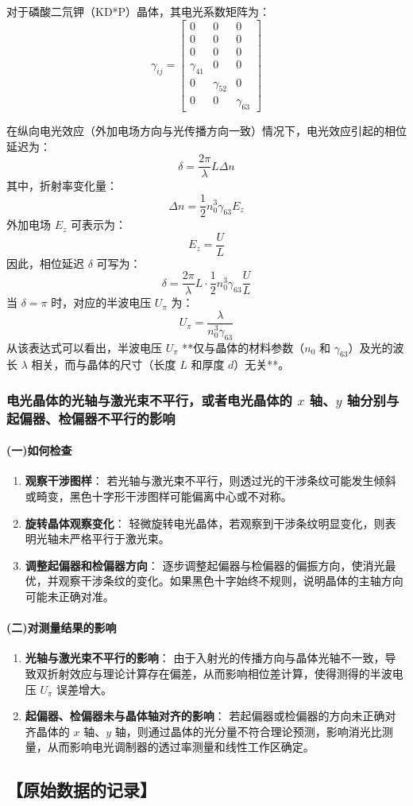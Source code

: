 \documentclass[12pt,a4paper,UTF8]{ctexart}
\begin{document}
对于磷酸二氘钾（KD*P）晶体，其电光系数矩阵为：
\[
\gamma_{ij} =
\begin{bmatrix}
0 & 0 & 0 \\
0 & 0 & 0 \\
0 & 0 & 0 \\
\gamma_{41} & 0 & 0 \\
0 & \gamma_{52} & 0 \\
0 & 0 & \gamma_{63}
\end{bmatrix}
\]

在纵向电光效应（外加电场方向与光传播方向一致）情况下，电光效应引起的相位延迟为：
\[
\delta = \frac{2\pi}{\lambda} L \Delta n
\]
其中，折射率变化量：
\[
\Delta n = \frac{1}{2} n_0^3 \gamma_{63} E_z
\]
外加电场 $E_z$ 可表示为：
\[
E_z = \frac{U}{L}
\]
因此，相位延迟 $\delta$ 可写为：
\[
\delta = \frac{2\pi}{\lambda} L \cdot \frac{1}{2} n_0^3 \gamma_{63} \frac{U}{L}
\]
当 $\delta = \pi$ 时，对应的半波电压 $U_\pi$ 为：
\[
U_\pi = \frac{\lambda}{n_0^3 \gamma_{63}}
\]
从该表达式可以看出，半波电压 $U_\pi$ **仅与晶体的材料参数（$n_0$ 和 $\gamma_{63}$）及光的波长 $\lambda$ 相关，而与晶体的尺寸（长度 $L$ 和厚度 $d$）无关**。

\subsubsection*{电光晶体的光轴与激光束不平行，或者电光晶体的 $x$ 轴、$y$ 轴分别与起偏器、检偏器不平行的影响}

\paragraph*{(一)如何检查}
\begin{enumerate}
    \item \textbf{观察干涉图样}：
    若光轴与激光束不平行，则透过光的干涉条纹可能发生倾斜或畸变，黑色十字形干涉图样可能偏离中心或不对称。
    \item \textbf{旋转晶体观察变化}：
    轻微旋转电光晶体，若观察到干涉条纹明显变化，则表明光轴未严格平行于激光束。
    \item \textbf{调整起偏器和检偏器方向}：
    逐步调整起偏器与检偏器的偏振方向，使消光最优，并观察干涉条纹的变化。如果黑色十字始终不规则，说明晶体的主轴方向可能未正确对准。
\end{enumerate}

\paragraph*{(二)对测量结果的影响}
\begin{enumerate}
    \item \textbf{光轴与激光束不平行的影响}：
    由于入射光的传播方向与晶体光轴不一致，导致双折射效应与理论计算存在偏差，从而影响相位差计算，使得测得的半波电压 $U_\pi$ 误差增大。
    \item \textbf{起偏器、检偏器未与晶体轴对齐的影响}：
    若起偏器或检偏器的方向未正确对齐晶体的 $x$ 轴、$y$ 轴，则通过晶体的光分量不符合理论预测，影响消光比测量，从而影响电光调制器的透过率测量和线性工作区确定。
\end{enumerate}

\subsection*{【原始数据的记录】}

\end{document}
